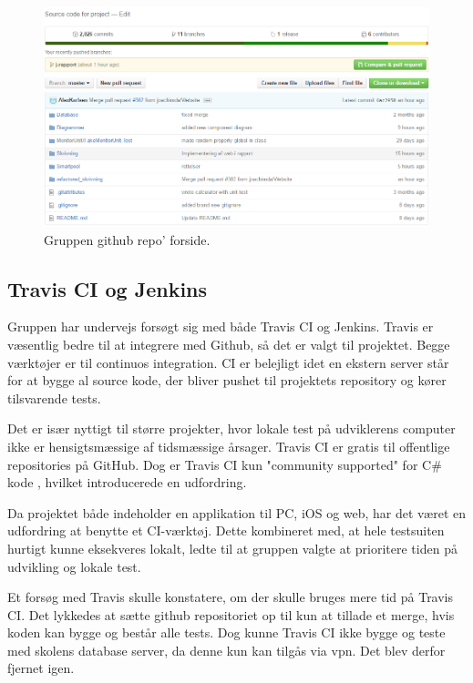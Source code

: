 \begin{figure}
\centering
\includegraphics[width=\linewidth]{figs/gitOverall}
\caption{Gruppen github repo' forside.}
\label{fig:gitOverall}
\end{figure}


\subsection{Travis CI og Jenkins} 
Gruppen har undervejs forsøgt sig med både Travis CI og Jenkins. Travis er væsentlig bedre til at integrere med Github, så det er valgt til projektet.
Begge værktøjer er til continuos integration. CI er belejligt idet en ekstern server står for at bygge al source kode, der bliver pushet til projektets repository og kører tilsvarende tests.

Det er især nyttigt til større projekter, hvor lokale test på udviklerens computer ikke er hensigtsmæssige af tidsmæssige årsager. Travis CI er gratis til offentlige repositories på GitHub. Dog er Travis CI kun "community supported" for C\# kode \cite{communitysupportedlanguages2016}, hvilket introducerede en udfordring.

Da projektet både indeholder en applikation til PC, iOS og web, har det været en udfordring at benytte et CI-værktøj. Dette kombineret med, at hele testsuiten hurtigt kunne eksekveres lokalt, ledte til at gruppen valgte at prioritere tiden på udvikling og lokale test.

Et forsøg med Travis skulle konstatere, om der skulle bruges mere tid på Travis CI. Det lykkedes at sætte github repositoriet op til kun at tillade et merge, hvis koden kan bygge og består alle tests. Dog kunne Travis CI ikke bygge og teste med skolens database server, da denne kun kan tilgås via vpn. Det blev derfor fjernet igen.

